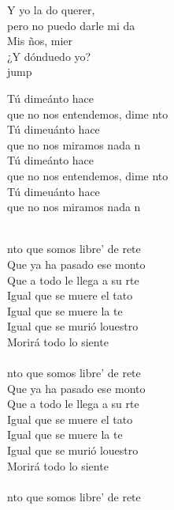 \begin{cancion}
	Y yo la do querer, \\
	pero no puedo darle mi da\\
	Mis ños, mier\\
	¿Y dónduedo yo?\\jump\\
	\begin{chorus}%
	Tú dimeánto hace \\
	que no nos entendemos, dime nto \\
	Tú dimeuánto hace  \\
	que no nos miramos nada n\\
	Tú dimeánto hace  \\
	que no nos entendemos, dime nto \\
	Tú dimeuánto hace  \\
	que no nos miramos nada n\\
	\end{chorus}%
	\jump\\
	nto que somos libre' de rete\\
	Que ya ha pasado ese monto\\
	Que a todo le llega a su rte\\
	Igual que se muere el tato\\
	Igual que se muere la te\\
	Igual que se murió louestro\\
	Morirá todo lo siente\\
	\jump\\
	nto que somos libre' de rete\\
	Que ya ha pasado ese monto\\
	Que a todo le llega a su rte\\
	Igual que se muere el tato\\
	Igual que se muere la te\\
	Igual que se murió louestro\\
	Morirá todo lo siente\\
	\jump\\
	nto que somos libre' de rete\\

\end{cancion}
